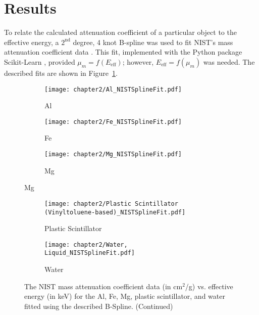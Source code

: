 \section{Results}
\par To relate the calculated attenuation coefficient of a particular object to the effective energy, a $2^\text{nd}$ degree, 4 knot B-spline was used to fit NIST's mass attenuation coefficient data \cite{hubbell1982photon}. This fit, implemented with the Python package Scikit-Learn \cite{SKLearn}, provided $\mu_m = f(E_{\text{eff}})$; however, $E_{\text{eff}} = f(\mu_m)$ was needed. The described fits are shown in Figure~\ref{figure:NISTSplineFit}.


\begin{figure}[H]
    \centering
    \begin{subfigure}{\linewidth}
        \texttt{[image: chapter2/Al\_NISTSplineFit.pdf]}
        \caption{Al}
    \end{subfigure}
    \begin{subfigure}{\linewidth}
        \texttt{[image: chapter2/Fe\_NISTSplineFit.pdf]}
        \caption{Fe}
    \end{subfigure}
    \begin{subfigure}{\linewidth}
        \texttt{[image: chapter2/Mg\_NISTSplineFit.pdf]}
        \caption{Mg}
    \end{subfigure}
\end{figure}


\begin{figure}[H]
    \ContinuedFloat
    \centering

    \begin{subfigure}{\linewidth}
        \texttt{[image: chapter2/Plastic Scintillator (Vinyltoluene-based)\_NISTSplineFit.pdf]}
        \caption{Plastic Scintillator}
    \end{subfigure}

    \begin{subfigure}{\linewidth}
        \texttt{[image: chapter2/Water, Liquid\_NISTSplineFit.pdf]}
        \caption{Water}
    \end{subfigure}

    \caption{The NIST mass attenuation coefficient data (in cm$^2$/g) vs. effective energy (in keV) for the Al, Fe, Mg, plastic scintillator, and water fitted using the described B-Spline. (Continued)}
    \label{figure:NISTSplineFit}
\end{figure}

